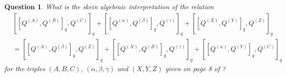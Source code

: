 \documentclass{article}
\newtheorem{qs}[thm]{Question}
\begin{document}
\begin{qs} What is the skein algebraic interpretation of the relation 
\begin{align*}
&\left[\left[Q^{(A)}, Q^{(B)}\right]_q, Q^{(C)}\right]_q 
+ \left[\left[Q^{(\alpha)}, Q^{(\beta)}\right]_q, Q^{(\gamma)}\right]_q 
+ \left[\left[Q^{(X)}, Q^{(Y)}\right]_q, Q^{(Z)}\right]_q \\
&= \left[\left[Q^{(A)}, Q^{(\beta)}\right]_q, Q^{(Z)}\right]_q
+ \left[\left[Q^{(X)}, Q^{(B)}\right]_q, Q^{(\gamma)}\right]_q
+ \left[\left[Q^{(\alpha)}, Q^{(Y)}\right]_q, Q^{(C)}\right]_q 
\end{align*}
for the triples $(A,B,C)$, $(\alpha, \beta, \gamma)$ and $(X,Y,Z)$ given on page 8 of \cite{PostWalter}?
\end{qs}

\printbibliography
\end{document}
